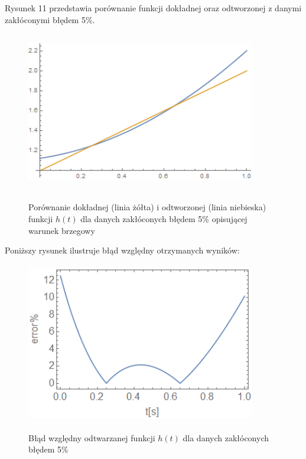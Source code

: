 \documentclass[twoside]{projektInzynierskiMS1}
\begin{document}
Rysunek 11 przedstawia porównanie funkcji dokładnej oraz odtworzonej z danymi zakłóconymi błędem 5\%.

\begin{figure}[H]
\begin{center}
		\includegraphics[height=7cm, width=10cm]{pics/5reconstruction.png}\\
	\caption{Porównanie dokładnej (linia żółta) i odtworzonej (linia niebieska) funkcji $h(t)$ dla danych zakłóconych błędem 5\% opisującej warunek brzegowy}
\end{center}
\end{figure}

Poniższy rysunek ilustruje błąd względny otrzymanych wyników:

\begin{figure}[H]
\begin{center}
		\includegraphics[height=7cm, width=10cm]{pics/5abs.png}\\
	\caption{Błąd względny odtwarzanej funkcji $h(t)$ dla danych zakłóconych błędem 5\%}
\end{center}
\end{figure}
\end{document}

